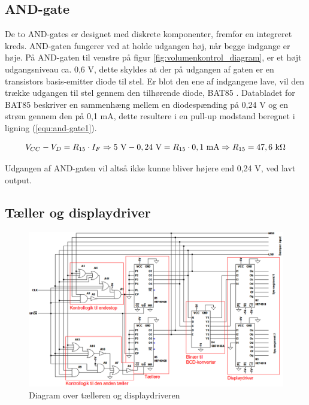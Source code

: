 \subsection*{AND-gate}
\label{volumenkontrol-design-and}

De to AND-gates er designet med diskrete komponenter, fremfor en integreret kreds. AND-gaten fungerer ved at holde udgangen høj, når begge indgange er høje. På AND-gaten til venstre på figur \ref{fig:volumenkontrol_diagram}, er et højt udgangsniveau ca. 0,6 V, dette skyldes at der på udgangen af gaten er en transistors basis-emitter diode til stel. Er blot den ene af indgangene lave, vil den trække udgangen til stel gennem den tilhørende diode, BAT85 \cite{bat85-datablad}. Databladet for BAT85 beskriver en sammenhæng mellem en diodespænding på 0,24 V og en strøm gennem den på 0,1 mA, dette resultere i en pull-up modstand beregnet i ligning (\ref{equ:and-gate1}).

\begin{equation}
\label{equ:and-gate1}
V_{CC} - V_D = R_{15} \cdot I_F \Rightarrow 5~\mathrm{V} - 0,24~\mathrm{V} = R_{15} \cdot 0,1~\mathrm{mA} \Rightarrow R_{15} = 47,6~\mathrm{k}\ohm
\end{equation}

Udgangen af AND-gaten vil altså ikke kunne bliver højere end 0,24 V, ved lavt output.

\clearpage
\subsection*{Tæller og displaydriver}
\label{volumenkontrol-design-taeller}

\begin{figure}[h]
\centering
\includegraphics[width=\textwidth]{teknisk/volumenkontrol/taeller.png}
\caption{Diagram over tælleren og displaydriveren}
\label{fig:taeller}
\end{figure}

